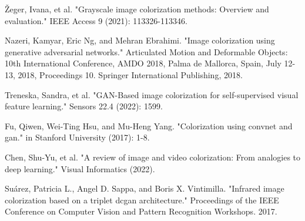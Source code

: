 \documentclass[conference]{IEEEtran}
\begin{document}
\begin{thebibliography}{00}
 Žeger, Ivana, et al. "Grayscale image colorization methods: Overview and evaluation." IEEE Access 9 (2021): 113326-113346.

 Nazeri, Kamyar, Eric Ng, and Mehran Ebrahimi. "Image colorization using generative adversarial networks." Articulated Motion and Deformable Objects: 10th International Conference, AMDO 2018, Palma de Mallorca, Spain, July 12-13, 2018, Proceedings 10. Springer International Publishing, 2018.

 Treneska, Sandra, et al. "GAN-Based image colorization for self-supervised visual feature learning." Sensors 22.4 (2022): 1599.

 Fu, Qiwen, Wei-Ting Hsu, and Mu-Heng Yang. "Colorization using convnet and gan." in Stanford University (2017): 1-8.

 Chen, Shu-Yu, et al. "A review of image and video colorization: From analogies to deep learning." Visual Informatics (2022).

 Suárez, Patricia L., Angel D. Sappa, and Boris X. Vintimilla. "Infrared image colorization based on a triplet dcgan architecture." Proceedings of the IEEE Conference on Computer Vision and Pattern Recognition Workshops. 2017.

\end{thebibliography}
\end{document}

